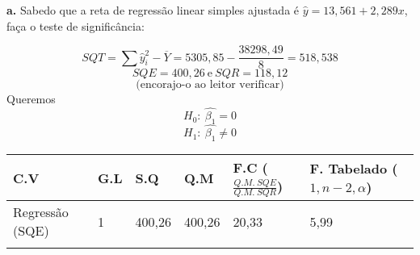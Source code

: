 \documentclass[
  openany]{book}
\begin{document}
\textbf{a.} Sabedo que a reta de regressão linear simples ajustada é \(\hat{y}=13,561+2,289x\), faça o teste de significância:

\[SQT=\sum \hat{y}^2_i - \overline{Y}=5305,85-\frac{38298,49}{8}=518,538\]
\[SQE = 400,26 \ \mbox{e} \ SQR=118,12\]
\[\mbox{(encorajo-o ao leitor verificar)}\]
Queremos
\[H_0: \ \hat{\beta_1}=0\]
\[H_1: \ \hat{\beta_1}\neq 0\]

\begin{longtable}[]{@{}llllll@{}}
\toprule
\begin{minipage}[b]{0.14\columnwidth}\raggedright
C.V\strut
\end{minipage} & \begin{minipage}[b]{0.14\columnwidth}\raggedright
G.L\strut
\end{minipage} & \begin{minipage}[b]{0.14\columnwidth}\raggedright
S.Q\strut
\end{minipage} & \begin{minipage}[b]{0.14\columnwidth}\raggedright
Q.M\strut
\end{minipage} & \begin{minipage}[b]{0.14\columnwidth}\raggedright
F.C (\(\frac{Q.M. \  SQE}{Q.M.\ SQR}\))\strut
\end{minipage} & \begin{minipage}[b]{0.14\columnwidth}\raggedright
F. Tabelado (\(1,n-2,\alpha\))\strut
\end{minipage}\tabularnewline
\midrule
\endhead
\begin{minipage}[t]{0.14\columnwidth}\raggedright
Regressão (SQE)\strut
\end{minipage} & \begin{minipage}[t]{0.14\columnwidth}\raggedright
1\strut
\end{minipage} & \begin{minipage}[t]{0.14\columnwidth}\raggedright
400,26\strut
\end{minipage} & \begin{minipage}[t]{0.14\columnwidth}\raggedright
400,26\strut
\end{minipage} & \begin{minipage}[t]{0.14\columnwidth}\raggedright
20,33\strut
\end{minipage} & \begin{minipage}[t]{0.14\columnwidth}\raggedright
5,99\strut
\end{minipage}\tabularnewline
\begin{minipage}[t]{0.14\columnwidth}\raggedright

\end{minipage}
\end{longtable}
\end{document}
